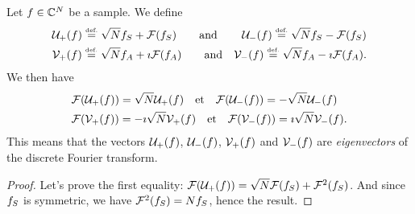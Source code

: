 \begin{thmdefn}
  Let $ f \in \mathbb{C}^N $ be a sample. We define
\begin{align*}
& \mathcal{U}_+ (f) \stackrel{\mbox{\upshape\tiny def.}}{=} \sqrt{N} {f}_S + \mathcal{F}({f}_S) \quad \quad \text{and} & \mathcal{U}_- (f) \stackrel{\mbox{\upshape\tiny def.}}{=} \sqrt{N} {f}_S - \mathcal{F}({f}_S) \\
& \mathcal{V}_+ (f) \stackrel{\mbox{\upshape\tiny def.}}{=} \sqrt{N} {f}_A + \imath \mathcal{F}({f}_A) \quad \quad \text{and} & \mathcal{V}_- (f) \stackrel{\mbox{\upshape\tiny def.}}{=} \sqrt{N} {f}_A - \imath \mathcal{F}({f}_A).
\end{align*}
We then have
\begin{align*}
& \mathcal{F}(\mathcal{U}_+ (f)) = \sqrt{N} \mathcal{U}_+ (f) \quad \text{et} \quad \mathcal{F}(\mathcal{U}_- (f)) = - \sqrt{N} \mathcal{U}_- (f) \\
& \mathcal{F}(\mathcal{V}_+ (f)) = - \imath \sqrt{N} \mathcal{V}_+ (f) \quad \text{et} \quad \mathcal{F}(\mathcal{V}_- (f)) = \imath \sqrt{N} \mathcal{V}_- (f).
\end{align*}
This means that the vectors $ \mathcal{U}_+ (f) $, $ \mathcal{U}_- (f) $, $ \mathcal{V}_+ (f) $ and $ \mathcal{V}_- (f) $ are \textit{eigenvectors} of the discrete Fourier transform.
\end{thmdefn}
\begin{proof}
Let's prove the first equality: $ \mathcal{F}(\mathcal{U}_+ (f)) = \sqrt{N} \mathcal{F}({f}_S) + \mathcal{F}^2 ({f}_S) $. And since $ {f}_S $ is symmetric, we have $ \mathcal{F}^2 ({f}_S) = N {f}_S $, hence the result.
\end{proof}
 
